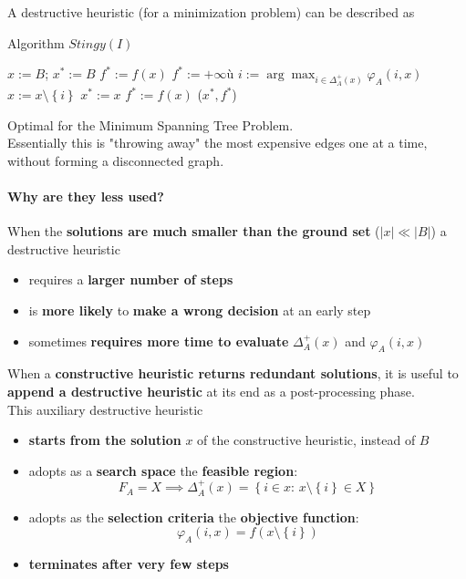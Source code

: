 A destructive heuristic (for a minimization problem) can be described as
\begin{algorithm}
	\caption{Algorithm $Stingy(I)$}
	\begin{algorithmic}
		\STATE $x := B$; $x^\ast := B$
		\STATE $f^\ast := f (x)$ 
		\ELSE 
		\STATE $f^\ast := + \infty$ù
		\ENDIF
		\STATE $i := \arg \max_{i \in \Delta_A^+ (x)} \varphi_A (i,x)$
		\STATE $x := x \setminus \left\{i\right\}$
		\STATE $x^\ast := x$
		\STATE $f^\ast := f(x)$
		\ENDIF
		\ENDWHILE
		\RETURN ($x^\ast, f^\ast$)
	\end{algorithmic}
\end{algorithm}
Optimal for the Minimum Spanning Tree Problem.\\

Essentially this is "throwing away" the most expensive edges one at a time, without forming a disconnected graph.\\

\newpage

\paragraph{Why are they less used?} When the \textbf{solutions are much smaller than the ground set} ($|x| \ll |B|$) a destructive heuristic
\begin{itemize}
	\item requires a \textbf{larger number of steps}
	
	\item is \textbf{more likely} to \textbf{make a wrong decision} at an early step
	
	\item sometimes \textbf{requires more time to evaluate} $\Delta_A^+ (x)$ and $\varphi_A (i, x)$
\end{itemize}

When a \textbf{constructive heuristic returns redundant solutions}, it is useful to \textbf{append a destructive heuristic} at its end as a post-processing phase.\\

This auxiliary destructive heuristic
\begin{itemize}
	\item \textbf{starts from the solution} $x$ of the constructive heuristic, instead of $B$
	
	\item adopts as a \textbf{search space} the \textbf{feasible region}:
	$$ F_A = X \implies \Delta_A^+ (x) = \left\{ i \in x : \, x \setminus \left\{i\right\} \in X \right\} $$
	
	\item adopts as the \textbf{selection criteria} the \textbf{objective function}:
	$$ \varphi_A (i,x) = f (x \setminus \left\{i\right\}) $$
	
	\item \textbf{terminates after very few steps}
\end{itemize}

